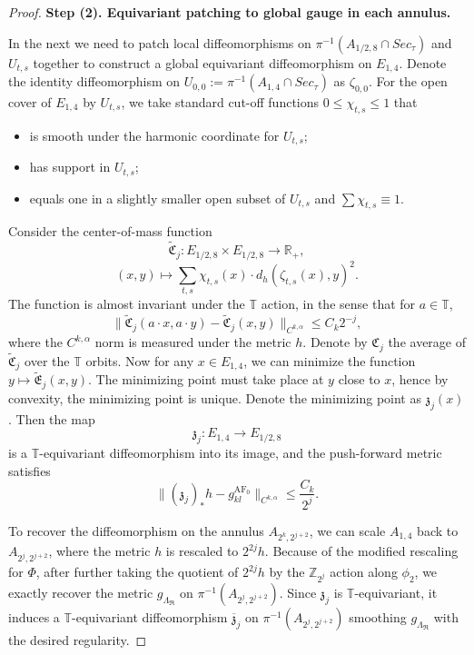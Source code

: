 \documentclass[10pt,a4paper]{amsart}
\DeclareMathOperator{\AF}{AF}
\newcommand{\mR} {\mathfrak R}
\begin{document}
\begin{proof}
    \vspace{10pt}
    \noindent\textbf{Step (2). Equivariant patching to global gauge in each annulus.}
    \vspace{10pt}



    In the next we need to patch local diffeomorphisms on $\pi^{-1}(A_{1/2,8}\cap Sec_\tau)$ and $U_{t,s}$ together to construct a global equivariant diffeomorphism on $E_{1,4}$. Denote the identity diffeomorphism on $U_{0,0}:=\pi^{-1}(A_{1,4}\cap Sec_\tau)$ as $\zeta_{0,0}$. For the open cover of $E_{1,4}$ by $U_{t,s}$, we take standard cut-off functions $0\leq \chi_{t,s}\leq1$ that
    \begin{itemize}
        \item is smooth under the harmonic coordinate for $U_{t,s}$;
        \item has support in $U_{t,s}$; 
        \item equals one in a slightly smaller open subset of $U_{t,s}$ and $\sum\chi_{t,s}\equiv1$.
    \end{itemize}
    Consider the center-of-mass function
    $$\widetilde{\mathfrak{C}}_j:E_{1/2,8}\times E_{1/2,8}\to\mathbb{R}_+,$$
    $$(x,y)\mapsto \sum_{t,s}\chi_{t,s}(x)\cdot d_{h}(\zeta_{t,s}(x),y)^2.$$
    The function is almost invariant under the $\mathbb{T}$ action, in the sense that for $a\in \mathbb{T}$, $$\|\widetilde{\mathfrak{C}}_j(a\cdot x,a\cdot y)-\widetilde{\mathfrak{C}}_j(x,y)\|_{C^{k,\alpha}}\leq C_k2^{-j},$$ where the $C^{k,\alpha}$ norm is measured under the metric $h$. Denote by $\mathfrak{C}_j$ the average of  $\widetilde{\mathfrak{C}}_j$ over the $\mathbb T$ orbits.
    Now for any $x\in E_{1,4}$, we can minimize the function $y\mapsto \widetilde{\mathfrak{E}}_j(x,y)$. The minimizing point must take place at $y$  close to $x$, hence by convexity, the minimizing point is unique. Denote the minimizing point as $\mathfrak{z}_j(x)$. Then the map 
    $$\mathfrak{z}_j:E_{1,4}\to E_{1/2,8}$$
    is a $\mathbb{T}$-equivariant diffeomorphism into its image, and the push-forward metric satisfies
    $$\|(\mathfrak{z}_j)_*h-g^{\AF_0}_{kl}\|_{C^{k,\alpha}}\leq\frac{C_k}{2^j}.$$



    To recover the diffeomorphism on the annulus $A_{2^k,2^{j+2}}$, we can scale $A_{1,4}$ back to $A_{2^j,2^{j+2}}$, where the metric $h$ is rescaled to $2^{2j}h$. Because of the modified rescaling for $\Phi$, after further taking the quotient of $2^{2j}h$ by the $\mathbb{Z}_{2^j}$ action along $\phi_2$, we exactly recover the metric $g_{\Lambda_{\mR}}$ on $\pi^{-1}(A_{2^j,2^{j+2}})$. Since $\mathfrak{z}_j$ is $\mathbb{T}$-equivariant, it induces a $\mathbb{T}$-equivariant diffeomorphism $\overline{\mathfrak{z}}_j$ on $\pi^{-1}(A_{2^j,2^{j+2}})$ smoothing $g_{\Lambda_{\mR}}$ with the desired regularity.





\end{proof}
\end{document}
